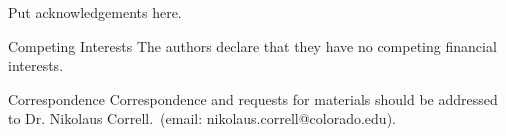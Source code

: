 \documentclass{nature}
\begin{document}
\cite{Yoshida2010}

\cite{Suzuki2015}






\begin{addendum}
 \item Put acknowledgements here.
 \item[Competing Interests] The authors declare that they have no
competing financial interests.
 \item[Correspondence] Correspondence and requests for materials
should be addressed to Dr. Nikolaus Correll.~(email: nikolaus.correll@colorado.edu).
\end{addendum}

\end{document}
